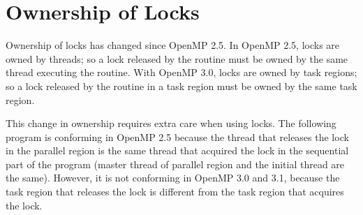 \pagebreak
\chapter{Ownership of Locks}
\label{chap:lock_owner}

Ownership of locks has changed since OpenMP 2.5. In OpenMP 2.5, locks are owned 
by threads; so a lock released by the  routine must be 
owned by the same thread executing the routine.  With OpenMP 3.0, locks are owned 
by task regions; so a lock released by the  routine in 
a task region must be owned by the same task region.

This change in ownership requires extra care when using locks. The following program 
is conforming in OpenMP 2.5 because the thread that releases the lock  
in the parallel region is the same thread that acquired the lock in the sequential 
part of the program (master thread of parallel region and the initial thread are 
the same). However, it is not conforming in OpenMP 3.0 and 3.1, because the task 
region that releases the lock  is different from the task region that 
acquires the lock.




